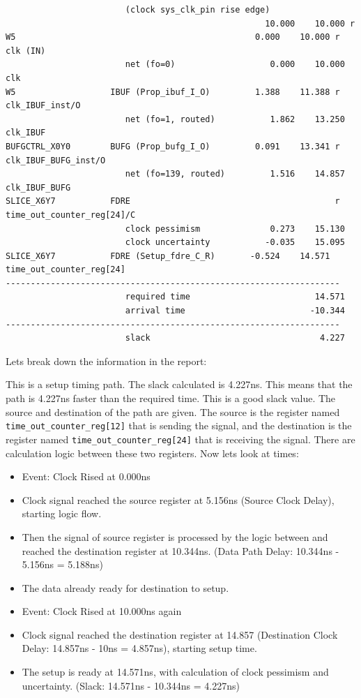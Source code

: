\documentclass{report}
\newenvironment{narrowmargins}{
    \newgeometry{top=1in, bottom=1in, left=0.5in, right=0.5in}
}{\restoregeometry}
\begin{document}
\begin{narrowmargins}
\begin{verbatim}
                        (clock sys_clk_pin rise edge)
                                                    10.000    10.000 r  
W5                                                0.000    10.000 r  clk (IN)
                        net (fo=0)                   0.000    10.000    clk
W5                   IBUF (Prop_ibuf_I_O)         1.388    11.388 r  clk_IBUF_inst/O
                        net (fo=1, routed)           1.862    13.250    clk_IBUF
BUFGCTRL_X0Y0        BUFG (Prop_bufg_I_O)         0.091    13.341 r  clk_IBUF_BUFG_inst/O
                        net (fo=139, routed)         1.516    14.857    clk_IBUF_BUFG
SLICE_X6Y7           FDRE                                         r  time_out_counter_reg[24]/C
                        clock pessimism              0.273    15.130    
                        clock uncertainty           -0.035    15.095    
SLICE_X6Y7           FDRE (Setup_fdre_C_R)       -0.524    14.571    time_out_counter_reg[24]
-------------------------------------------------------------------
                        required time                         14.571    
                        arrival time                         -10.344    
-------------------------------------------------------------------
                        slack                                  4.227  
\end{verbatim}
\end{narrowmargins}
Lets break down the information in the report:

This is a setup timing path. The slack calculated is 4.227ns. This means that the path is 4.227ns faster than the required time. This is a good slack value.
The source and destination of the path are given. The source is the register named \texttt{time\_out\_counter\_reg[12]} that is sending the signal, and the destination is the register named \texttt{time\_out\_counter\_reg[24]} that is receiving the signal.
There are calculation logic between these two registers. Now lets look at times:
\begin{itemize}
    \item Event: Clock Rised at 0.000ns
    \item Clock signal reached the source register at 5.156ns (Source Clock Delay), starting logic flow.
    \item Then the signal of source register is processed by the logic between and reached the destination register at 10.344ns. (Data Path Delay: 10.344ns - 5.156ns = 5.188ns)
    \item The data already ready for destination to setup.
    \item Event: Clock Rised at 10.000ns again
    \item Clock signal reached the destination register at 14.857 (Destination Clock Delay: 14.857ns - 10ns = 4.857ns), starting setup time.
    \item The setup is ready at 14.571ns, with calculation of clock pessimism and uncertainty. (Slack: 14.571ns - 10.344ns = 4.227ns)
\end{itemize}
\end{document}
